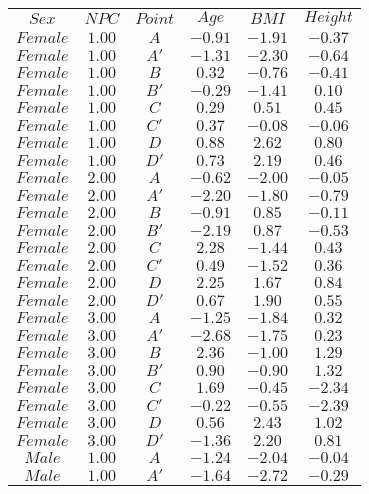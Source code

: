 \begin{tabular}{cccccc}
$Sex$ & $NPC$ & $Point$ & $Age$ & $BMI$ & $Height$\\
$Female$ & $1.00$ & $A$ & $-0.91$ & $-1.91$ & $-0.37$\\
$Female$ & $1.00$ & $A'$ & $-1.31$ & $-2.30$ & $-0.64$\\
$Female$ & $1.00$ & $B$ & $0.32$ & $-0.76$ & $-0.41$\\
$Female$ & $1.00$ & $B'$ & $-0.29$ & $-1.41$ & $0.10$\\
$Female$ & $1.00$ & $C$ & $0.29$ & $0.51$ & $0.45$\\
$Female$ & $1.00$ & $C'$ & $0.37$ & $-0.08$ & $-0.06$\\
$Female$ & $1.00$ & $D$ & $0.88$ & $2.62$ & $0.80$\\
$Female$ & $1.00$ & $D'$ & $0.73$ & $2.19$ & $0.46$\\
$Female$ & $2.00$ & $A$ & $-0.62$ & $-2.00$ & $-0.05$\\
$Female$ & $2.00$ & $A'$ & $-2.20$ & $-1.80$ & $-0.79$\\
$Female$ & $2.00$ & $B$ & $-0.91$ & $0.85$ & $-0.11$\\
$Female$ & $2.00$ & $B'$ & $-2.19$ & $0.87$ & $-0.53$\\
$Female$ & $2.00$ & $C$ & $2.28$ & $-1.44$ & $0.43$\\
$Female$ & $2.00$ & $C'$ & $0.49$ & $-1.52$ & $0.36$\\
$Female$ & $2.00$ & $D$ & $2.25$ & $1.67$ & $0.84$\\
$Female$ & $2.00$ & $D'$ & $0.67$ & $1.90$ & $0.55$\\
$Female$ & $3.00$ & $A$ & $-1.25$ & $-1.84$ & $0.32$\\
$Female$ & $3.00$ & $A'$ & $-2.68$ & $-1.75$ & $0.23$\\
$Female$ & $3.00$ & $B$ & $2.36$ & $-1.00$ & $1.29$\\
$Female$ & $3.00$ & $B'$ & $0.90$ & $-0.90$ & $1.32$\\
$Female$ & $3.00$ & $C$ & $1.69$ & $-0.45$ & $-2.34$\\
$Female$ & $3.00$ & $C'$ & $-0.22$ & $-0.55$ & $-2.39$\\
$Female$ & $3.00$ & $D$ & $0.56$ & $2.43$ & $1.02$\\
$Female$ & $3.00$ & $D'$ & $-1.36$ & $2.20$ & $0.81$\\
$Male$ & $1.00$ & $A$ & $-1.24$ & $-2.04$ & $-0.04$\\
$Male$ & $1.00$ & $A'$ & $-1.64$ & $-2.72$ & $-0.29$\\

\end{tabular}
